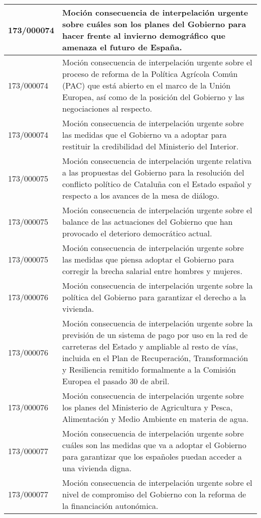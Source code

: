 {\begin{table}[H]
\begin{center}
\begin{tabularx}{\linewidth}{| l | X |}
\hline
173/000074 & Moción consecuencia de interpelación urgente sobre cuáles son los planes del Gobierno para hacer frente al invierno demográfico que amenaza el futuro de España. \\
\hline
173/000074 & Moción consecuencia de interpelación urgente sobre el proceso de reforma de la Política Agrícola Común (PAC) que está abierto en el marco de la Unión Europea, así como de la posición del Gobierno y las negociaciones al respecto. \\
\hline
173/000074 & Moción consecuencia de interpelación urgente sobre las medidas que el Gobierno va a adoptar para restituir la credibilidad del Ministerio del Interior. \\
\hline
173/000075 & Moción consecuencia de interpelación urgente relativa a las propuestas del Gobierno para la resolución del conflicto político de Cataluña con el Estado español y respecto a los avances de la mesa de diálogo. \\
\hline
173/000075 & Moción consecuencia de interpelación urgente sobre el balance de las actuaciones del Gobierno que han provocado el deterioro democrático actual. \\
\hline
173/000075 & Moción consecuencia de interpelación urgente sobre las medidas que piensa adoptar el Gobierno para corregir la brecha salarial entre hombres y mujeres. \\
\hline
173/000076 & Moción consecuencia de interpelación urgente sobre la política del Gobierno para garantizar el derecho a la vivienda. \\
\hline
173/000076 & Moción consecuencia de interpelación urgente sobre la previsión de un sistema de pago por uso en la red de carreteras del Estado y ampliable al resto de vías, incluida en el Plan de Recuperación, Transformación y Resiliencia remitido formalmente a la Comisión Europea el pasado 30 de abril. \\
\hline
173/000076 & Moción consecuencia de interpelación urgente sobre los planes del Ministerio de Agricultura y Pesca, Alimentación y Medio Ambiente en materia de agua. \\
\hline
173/000077 & Moción consecuencia de interpelación urgente sobre cuáles son las medidas que va a adoptar el Gobierno para garantizar que los españoles puedan acceder a una vivienda digna. \\
\hline
173/000077 & Moción consecuencia de interpelación urgente sobre el nivel de compromiso del Gobierno con la reforma de la financiación autonómica. \\

\end{tabularx}
\end{center}
\end{table}}
